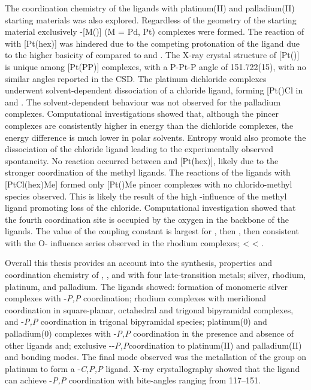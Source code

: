 The coordination chemistry of the \tBuxantphos{} ligands with platinum(II) and palladium(II) starting materials was also explored.  Regardless of the geometry of the starting material exclusively \trans{}-[M(\tBuxantphos)] (M = Pd, Pt) complexes were formed.  The reaction of \tBusixantphos{} with [Pt(hex)] was hindered due to the competing protonation of the ligand due to the higher basicity of \tBusixantphos{} compared to \tButhixantphos{} and \tBuxantphos{}.  The X-ray crystal structure of [Pt(\tBuxantphos)] is unique among [Pt(PP)] complexes, with a P-Pt-P angle of 151.722(15)\degrees{}, with no similar angles reported in the \gls{CSD}.  The platinum dichloride complexes underwent solvent-dependent dissociation of a chloride ligand, forming [Pt(\tBuxantphosk)Cl\ce{]+} in  and .  The solvent-dependent behaviour was not observed for the palladium complexes.  Computational investigations showed that, although the pincer complexes are consistently higher in energy than the dichloride complexes, the energy difference is much lower in polar solvents.  Entropy would also promote  the dissociation of the chloride ligand leading to the experimentally observed spontaneity.  No reaction occurred between \tButhixantphos{} and [Pt(hex)], likely due to the stronger coordination of the methyl ligands.  The reactions of the \tBuxantphos{} ligands with [PtCl(hex)Me] formed only [Pt(\tBuxantphos)Me\ce{]+} pincer complexes with no chlorido-methyl species observed.  This is likely the result of the high \trans{}-influence of the methyl ligand promoting loss of the chloride.  Computational investigation showed that the fourth coordination site is occupied by the oxygen in the backbone of the \tBuxantphos{} ligands.  The value of the \JPtC{} coupling constant is largest for \tBusixantphos{}, then \tButhixantphos{}, then \tBuxantphos{} consistent with the O-\trans{} influence series observed in the rhodium complexes; \tBusixantphos{} \textless{} \tButhixantphos{} \textless{} \tBuxantphos.  

Overall this thesis provides an account into the synthesis, properties and coordination chemistry of \tBusixantphos, \tButhixantphos{}, and \tBuxantphos{} with four late-transition metals; silver, rhodium, platinum, and palladium.  The ligands showed: formation of monomeric silver complexes with \dento{}-\emph{P,P}\textprime{} coordination; rhodium complexes with meridional \POP{} coordination in square-planar, octahedral and trigonal bipyramidal complexes, and \dento{}-\emph{P,P}\textprime{} coordination in trigonal bipyramidal species; platinum(0) and palladium(0) complexes with \dento{}-\emph{P,P}\textprime{} coordination in the presence and absence of other ligands and; exclusive \trans{}-\dento{}-\emph{P,P}\textprime{}coordination to platinum(II) and palladium(II) and \POP{} bonding modes.  The final mode observed was the metallation of the \tBu{} group on platinum to form a \dento{}-\emph{C,P,P}\textprime{} ligand.  X-ray crystallography showed that the \tButhixantphos{} ligand can achieve \dento{}-\emph{P,P}\textprime{} coordination with bite-angles ranging from 117--151\degrees{}.  

